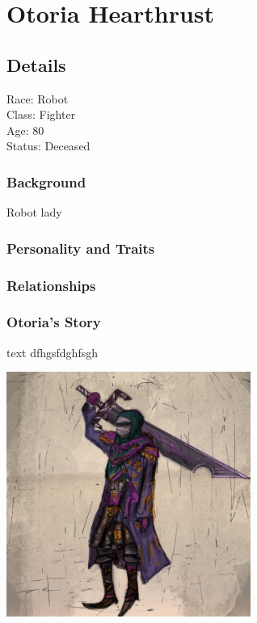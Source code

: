 \section{Otoria Hearthrust}

\vspace{5mm}

\subsection*{Details} 

\noindent

Race: 	Robot \\
Class: 	Fighter \\
Age: 	80 \\
Status: Deceased 

\subsubsection{Background}

Robot lady

\subsubsection{Personality and Traits}



\subsubsection{Relationships}



\subsubsection{Otoria's Story}



\begin{DndSidebar}{text}
 dfhgsfdghfsgh
\end{DndSidebar}

\begin{center}
\includegraphics[width=80mm]{./content/img/otoria1.png}
\begin{figure}[h]
\end{figure}
\end{center}

\smallskip

\bigskip


\clearpage